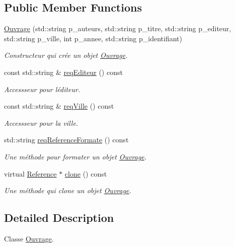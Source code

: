 \subsection*{Public Member Functions}
\begin{DoxyCompactItemize}
\item 
\hyperlink{classbiblio_1_1Ouvrage_ac3c4cb2c73e6382eb6760297bdace9e7}{Ouvrage} (std\+::string p\+\_\+auteurs, std\+::string p\+\_\+titre, std\+::string p\+\_\+editeur, std\+::string p\+\_\+ville, int p\+\_\+annee, std\+::string p\+\_\+identifiant)
\begin{DoxyCompactList}\small\item\em Constructeur qui crée un objet \hyperlink{classbiblio_1_1Ouvrage}{Ouvrage}. \end{DoxyCompactList}\item 
const std\+::string \& \hyperlink{classbiblio_1_1Ouvrage_ae1d95d392ad151ef64dfcc7742e741df}{req\+Editeur} () const 
\begin{DoxyCompactList}\small\item\em Accessseur pour l\textquotesingle{}éditeur. \end{DoxyCompactList}\item 
const std\+::string \& \hyperlink{classbiblio_1_1Ouvrage_a7d376d2d74056e00dfdc38d7626575be}{req\+Ville} () const 
\begin{DoxyCompactList}\small\item\em Accessseur pour la ville. \end{DoxyCompactList}\item 
std\+::string \hyperlink{classbiblio_1_1Ouvrage_afe9e9c3ca248578c1799bd3bce528835}{req\+Reference\+Formate} () const 
\begin{DoxyCompactList}\small\item\em Une méthode pour formater un objet \hyperlink{classbiblio_1_1Ouvrage}{Ouvrage}. \end{DoxyCompactList}\item 
virtual \hyperlink{classbiblio_1_1Reference}{Reference} $\ast$ \hyperlink{classbiblio_1_1Ouvrage_a3c79215a9af35ef05d1d89ba25ae21bb}{clone} () const 
\begin{DoxyCompactList}\small\item\em Une méthode qui clone un objet \hyperlink{classbiblio_1_1Ouvrage}{Ouvrage}. \end{DoxyCompactList}\end{DoxyCompactItemize}


\subsection{Detailed Description}
Classe \hyperlink{classbiblio_1_1Ouvrage}{Ouvrage}. 


